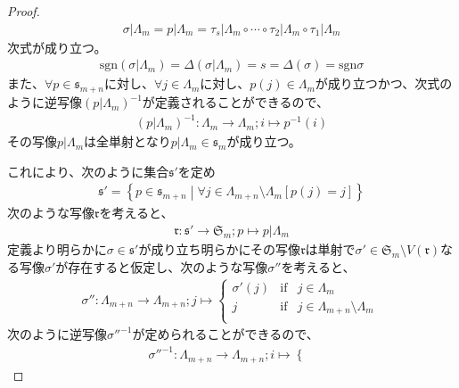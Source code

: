 \documentclass[dvipdfmx]{jsarticle}
\begin{document}
\begin{proof}
\begin{align*}
\sigma|\varLambda_{m} = p|\varLambda_{m} = \tau_{s}|\varLambda_{m} \circ \cdots \circ \tau_{2}|\varLambda_{m} \circ \tau_{1}|\varLambda_{m}
\end{align*}
次式が成り立つ。
\begin{align*}
{\mathrm{sgn} }\left( \sigma|\varLambda_{m} \right) = \Delta\left( \sigma|\varLambda_{m} \right) = s = \Delta(\sigma) = {\mathrm{sgn} }\sigma
\end{align*}
また、$\forall p \in \mathfrak{s}_{m + n}$に対し、$\forall j \in \varLambda_{m}$に対し、$p(j) \in \varLambda_{m}$が成り立つかつ、次式のように逆写像$\left( p|\varLambda_{m} \right)^{- 1}$が定義されることができるので、
\begin{align*}
\left( p|\varLambda_{m} \right)^{- 1}:\varLambda_{m} \rightarrow \varLambda_{m};i \mapsto p^{- 1}(i)
\end{align*}
その写像$p|\varLambda_{m}$は全単射となり$p|\varLambda_{m} \in \mathfrak{s}_{m}$が成り立つ。\par
これにより、次のように集合$\mathfrak{s}'$を定め
\begin{align*}
\mathfrak{s}' = \left\{ p \in \mathfrak{s}_{m + n} \middle| \forall j \in \varLambda_{m + n} \setminus \varLambda_{m}\left[ p(j) = j \right] \right\}
\end{align*}
次のような写像$\mathfrak{r}$を考えると、
\begin{align*}
\mathfrak{r:}\mathfrak{s}' \rightarrow \mathfrak{S}_{m};p \mapsto p|\varLambda_{m}
\end{align*}
定義より明らかに$\sigma \in \mathfrak{s}'$が成り立ち明らかにその写像$\mathfrak{r}$は単射で$\sigma' \in \mathfrak{S}_{m} \setminus V\left( \mathfrak{r} \right)$なる写像$\sigma'$が存在すると仮定し、次のような写像$\sigma''$を考えると、
\begin{align*}
\sigma'':\varLambda_{m + n} \rightarrow \varLambda_{m + n};j \mapsto \left\{ \begin{matrix}
\sigma'(j) & \mathrm{if} & j \in \varLambda_{m} \\
j & \mathrm{if} & j \in \varLambda_{m + n} \setminus \varLambda_{m} \\
\end{matrix} \right.\ 
\end{align*}
次のように逆写像${\sigma''}^{- 1}$が定められることができるので、
\begin{align*}
{\sigma''}^{- 1}:\varLambda_{m + n} \rightarrow \varLambda_{m + n};i \mapsto \left\{ \begin{matrix}

\end{matrix}
\end{align*}
\end{proof}
\end{document}
